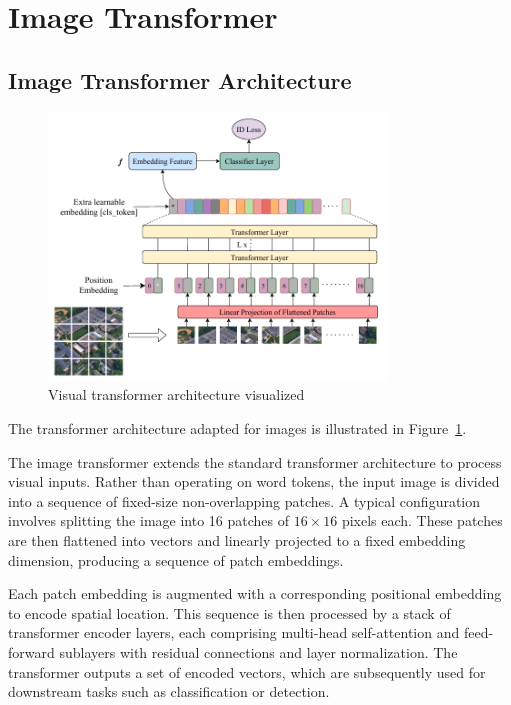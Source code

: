 \documentclass{pracalicmgr}
\begin{document}
\section{Image Transformer}

\subsection{Image Transformer Architecture}

\begin{figure}[h]
    \centering
    \includegraphics[width=0.8\textwidth]{src/visNet.pdf}
    \caption{Visual transformer architecture visualized}
    \label{fig:visNetArch}
\end{figure}

The transformer architecture adapted for images is illustrated in Figure~\ref{fig:visNetArch}.

The image transformer extends the standard transformer architecture to process visual inputs. Rather than operating on word tokens, the input image is divided into a sequence of fixed-size non-overlapping patches. A typical configuration involves splitting the image into 16 patches of \(16 \times 16\) pixels each. These patches are then flattened into vectors and linearly projected to a fixed embedding dimension, producing a sequence of patch embeddings.

Each patch embedding is augmented with a corresponding positional embedding to encode spatial location. This sequence is then processed by a stack of transformer encoder layers, each comprising multi-head self-attention and feed-forward sublayers with residual connections and layer normalization. The transformer outputs a set of encoded vectors, which are subsequently used for downstream tasks such as classification or detection.
\end{document}
